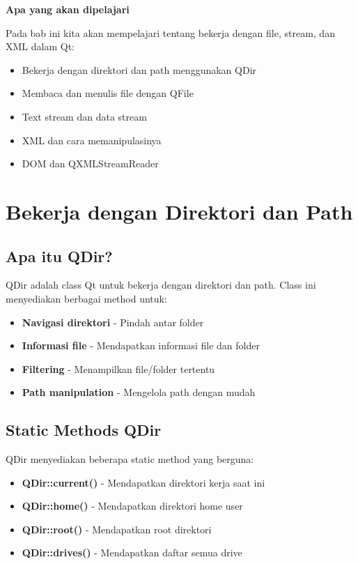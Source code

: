 \textbf{Apa yang akan dipelajari}

Pada bab ini kita akan mempelajari tentang bekerja dengan file, stream, dan XML dalam Qt:

\begin{itemize}
\item Bekerja dengan direktori dan path menggunakan QDir
\item Membaca dan menulis file dengan QFile
\item Text stream dan data stream
\item XML dan cara memanipulasinya
\item DOM dan QXMLStreamReader
\end{itemize}

\minitoc

\section{Bekerja dengan Direktori dan Path}

\subsection{Apa itu QDir?}

QDir adalah class Qt untuk bekerja dengan direktori dan path. Class ini menyediakan berbagai method untuk:

\begin{itemize}
\item \textbf{Navigasi direktori} - Pindah antar folder
\item \textbf{Informasi file} - Mendapatkan informasi file dan folder
\item \textbf{Filtering} - Menampilkan file/folder tertentu
\item \textbf{Path manipulation} - Mengelola path dengan mudah
\end{itemize}

\subsection{Static Methods QDir}

QDir menyediakan beberapa static method yang berguna:

\begin{itemize}
\item \textbf{QDir::current()} - Mendapatkan direktori kerja saat ini
\item \textbf{QDir::home()} - Mendapatkan direktori home user
\item \textbf{QDir::root()} - Mendapatkan root direktori
\item \textbf{QDir::drives()} - Mendapatkan daftar semua drive
\end{itemize}

